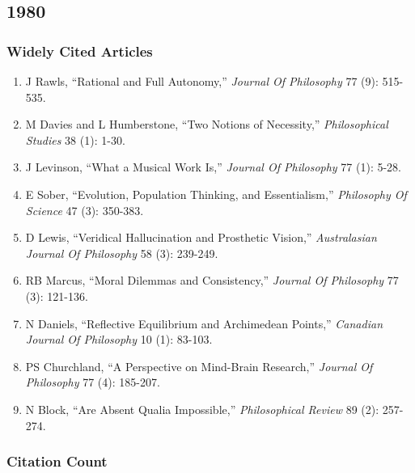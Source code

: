 \documentclass[
  10pt,
  letterpaper,
  DIV=11,
  numbers=noendperiod,
  twoside]{scrartcl}
\providecommand{\tightlist}{%
  \setlength{\itemsep}{0pt}\setlength{\parskip}{0pt}}\usepackage{longtable,booktabs,array}
\begin{document}
\newpage

\subsection{1980}\label{sec-s1980}

\subsubsection*{Widely Cited Articles}\label{widely-cited-articles-4}

\begin{enumerate}
\def\labelenumi{\arabic{enumi}.}
\tightlist
\item
  J Rawls, ``Rational and Full Autonomy,'' \emph{Journal Of Philosophy}
  77 (9): 515-535.
\item
  M Davies and L Humberstone, ``Two Notions of Necessity,''
  \emph{Philosophical Studies} 38 (1): 1-30.
\item
  J Levinson, ``What a Musical Work Is,'' \emph{Journal Of Philosophy}
  77 (1): 5-28.
\item
  E Sober, ``Evolution, Population Thinking, and Essentialism,''
  \emph{Philosophy Of Science} 47 (3): 350-383.
\item
  D Lewis, ``Veridical Hallucination and Prosthetic Vision,''
  \emph{Australasian Journal Of Philosophy} 58 (3): 239-249.
\item
  RB Marcus, ``Moral Dilemmas and Consistency,'' \emph{Journal Of
  Philosophy} 77 (3): 121-136.
\item
  N Daniels, ``Reflective Equilibrium and Archimedean Points,''
  \emph{Canadian Journal Of Philosophy} 10 (1): 83-103.
\item
  PS Churchland, ``A Perspective on Mind-Brain Research,'' \emph{Journal
  Of Philosophy} 77 (4): 185-207.
\item
  N Block, ``Are Absent Qualia Impossible,'' \emph{Philosophical Review}
  89 (2): 257-274.
\end{enumerate}

\subsubsection*{Citation Count}\label{sec-count-1980}
\end{document}
